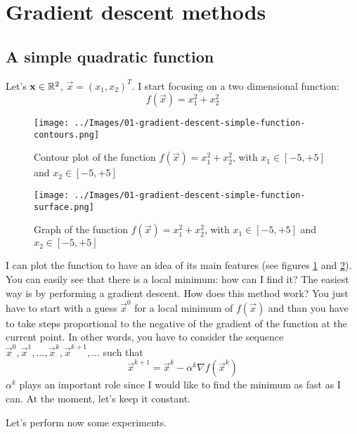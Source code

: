 \section{Gradient descent methods}
    \subsection{A simple quadratic function}
        Let's \(\mathbf{x} \in \mathbb{R}^2\), \(\vec{x} = (x_1, x_2)^T\). I start focusing on a two dimensional function:
        \[f(\vec{x}) = x_1^2 + x_2^2\]
        \begin{figure}
            \centering
            \texttt{[image: ../Images/01-gradient-descent-simple-function-contours.png]}
            \caption{Contour plot of the function \(f(\vec{x}) = x_{1}^{2} + x_{2}^{2}\), with \(x_1 \in [-5, +5]\) and \(x_2 \in [-5, +5]\)}
            \label{gradient-descent-simple-function-contours}
        \end{figure}
        \begin{figure}
            \centering
            \texttt{[image: ../Images/01-gradient-descent-simple-function-surface.png]}
            \caption{Graph of the function \(f(\vec{x}) = x_{1}^{2} + x_{2}^{2}\), with \(x_1 \in [-5, +5]\) and \(x_2 \in [-5, +5]\)}
            \label{gradient-descent-simple-function-surface}
        \end{figure}
        I can plot the function to have an idea of its main features (see figures \ref{gradient-descent-simple-function-contours} and \ref{gradient-descent-simple-function-surface}). You can easily see that there is a local minimum: how can I find it? The easiest way is by performing a gradient descent. How does this method work? You just have to start with a guess \(\vec{x}^0\) for a local minimum of \(f(\vec{x})\) and than you have to take steps proportional to the negative of the gradient of the function at the current point. In other words, you have to consider the sequence \(\vec{x}^0, \vec{x}^1, ..., \vec{x}^k, \vec{x}^{k+1}, ...\) such that
        \[\vec{x}^{k+1} = \vec{x}^k - \alpha^k \nabla f(\vec{x}^k)\]
        \(\alpha^k\) plays an important role since I would like to find the minimum as fast as I can. At the moment, let's keep it constant.\par
        Let's perform now some experiments.
